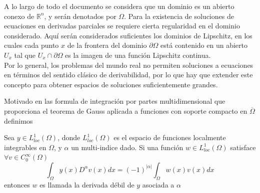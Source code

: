 \documentclass{article}
\begin{document}
\noindent
A lo largo de todo el documento se considera que un dominio es un abierto conexo de $\mathbb{R}^n$, y serán denotados por $\Omega$. Para la existencia de soluciones de ecuaciones en derivadas parciales se requiere cierta regularidad en el dominio considerado. Aquí serán considerados suficientes los dominios de Lipschitz, en los cuales cada punto $x$  de la frontera del dominio $\partial\Omega$ está contenido en un abierto $U_x$ tal que  $U_x\cap \partial\Omega$ es la imagen de una función Lipschitz continua.\\

\noindent
Por lo general, los problemas del mundo real no permiten soluciones a ecuaciones en términos del sentido clásico de derivabilidad, por lo que hay que extender este concepto para obtener espacios de soluciones suficientemente grandes. 

\noindent
Motivado en las formula de integración por partes multidimensional que proporciona el teorema de Gauss aplicada a funciones con soporte compacto en $\overline{\Omega}$ definimos
\theoremstyle{definition}
\begin{definition}
Sea $y\in L_{loc}^1(\Omega)$, donde $L_{loc}^1(\Omega)$ es el espacio de funciones localmente integrables en $\Omega$,  y $\alpha$ un multi-indice dado. Si una función $w\in  L_{loc}^1(\Omega)$ satisface $\forall v\in C_0^{\infty}(\Omega)$
\begin{equation}
    \int_{\Omega}y(x)D^\alpha v(x)dx=(-1)^{|\alpha|} \int_{\Omega}w(x)v(x)dx
\end{equation}
entonces $w$ es llamada la derivada débil de $y$ asociada a $\alpha$
\end{definition}
\end{document}
